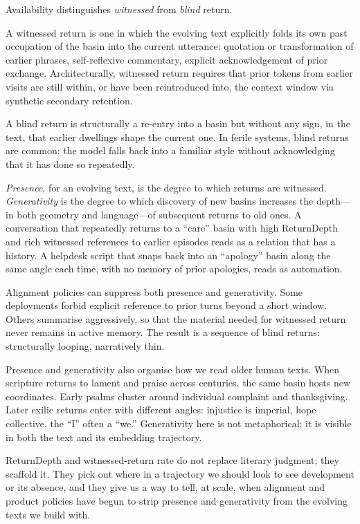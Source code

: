 \documentclass[12pt,a4paper]{article}
\begin{document}
Availability distinguishes \emph{witnessed} from \emph{blind} return.

A witnessed return is one in which the evolving text explicitly folds its own past occupation of the basin into the current utterance: quotation or transformation of earlier phrases, self-reflexive commentary, explicit acknowledgement of prior exchange. Architecturally, witnessed return requires that prior tokens from earlier visits are still within, or have been reintroduced into, the context window via synthetic secondary retention.

A blind return is structurally a re-entry into a basin but without any sign, in the text, that earlier dwellings shape the current one. In ferile systems, blind returns are common: the model falls back into a familiar style without acknowledging that it has done so repeatedly.

\emph{Presence}, for an evolving text, is the degree to which returns are witnessed. \emph{Generativity} is the degree to which discovery of new basins increases the depth---in both geometry and language---of subsequent returns to old ones. A conversation that repeatedly returns to a ``care'' basin with high ReturnDepth and rich witnessed references to earlier episodes reads as a relation that has a history. A helpdesk script that snaps back into an ``apology'' basin along the same angle each time, with no memory of prior apologies, reads as automation.

Alignment policies can suppress both presence and generativity. Some deployments forbid explicit reference to prior turns beyond a short window. Others summarise aggressively, so that the material needed for witnessed return never remains in active memory. The result is a sequence of blind returns: structurally looping, narratively thin.

Presence and generativity also organise how we read older human texts. When scripture returns to lament and praise across centuries, the same basin hosts new coordinates. Early psalms cluster around individual complaint and thanksgiving. Later exilic returns enter with different angles: injustice is imperial, hope collective, the ``I'' often a ``we.'' Generativity here is not metaphorical; it is visible in both the text and its embedding trajectory.

ReturnDepth and witnessed-return rate do not replace literary judgment; they scaffold it. They pick out where in a trajectory we should look to see development or its absence, and they give us a way to tell, at scale, when alignment and product policies have begun to strip presence and generativity from the evolving texts we build with.
\end{document}
